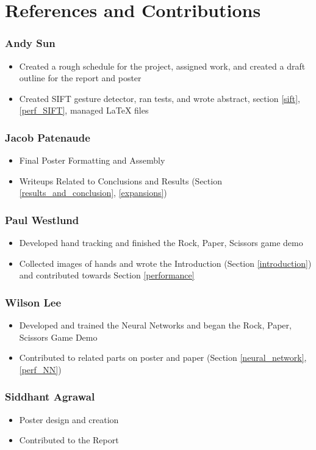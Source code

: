 \section{References and Contributions}

\subsubsection*{Andy Sun}
\begin{itemize}
\item Created a rough schedule for the project, assigned work, and created a draft outline for the report and poster
\item Created SIFT gesture detector, ran tests, and wrote abstract, section \ref{sift}, \ref{perf_SIFT}, managed \LaTeX{} files
\end{itemize}

\subsubsection*{Jacob Patenaude}
\begin{itemize}
\item Final Poster Formatting and Assembly
\item Writeups Related to Conclusions and Results (Section \ref{results_and_conclusion}, \ref{expansions})
\end{itemize}

\subsubsection*{Paul Westlund}
\begin{itemize}
\item Developed hand tracking and finished the Rock, Paper, Scissors game demo
\item Collected images of hands and wrote the Introduction (Section \ref{introduction}) and contributed towards Section \ref{performance}
\end{itemize}

\subsubsection*{Wilson Lee}
\begin{itemize}
\item Developed and trained the Neural Networks and began the Rock, Paper, Scissors Game Demo
\item Contributed to related parts on poster and paper (Section \ref{neural_network}, \ref{perf_NN})
\end{itemize}

\subsubsection*{Siddhant Agrawal}
\begin{itemize}
\item Poster design and creation
\item Contributed to the Report
\end{itemize}
